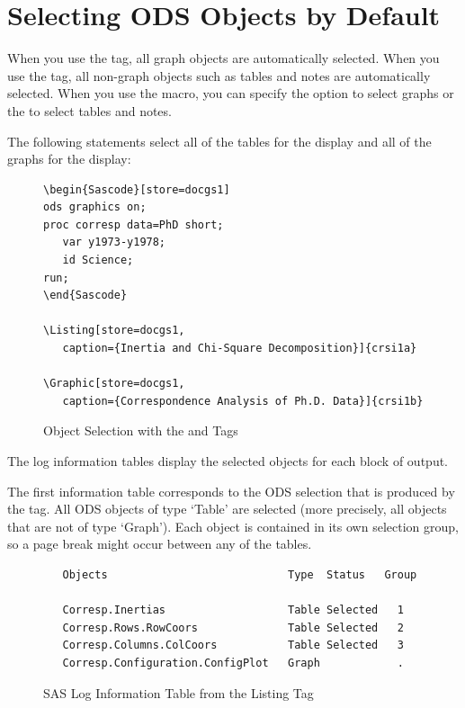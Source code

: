\documentclass[article,oneside]{memoir}
\begin{document}
\section{Selecting ODS Objects by Default}\label{odsdefault}

  When you use the  tag, all graph objects are automatically selected.
  When you use the  tag, all non-graph objects such as tables and notes
  are automatically selected.  When you use the  macro, you can specify
  the  option to select graphs or the  to
  select tables and notes.

  The following statements select all of the tables for the 
  display and all of the graphs for the  display:

\begin{figure}[H]
\begin{snugshade}
\begin{verbatim}
\begin{Sascode}[store=docgs1]
ods graphics on;
proc corresp data=PhD short;
   var y1973-y1978;
   id Science;
run;
\end{Sascode}

\Listing[store=docgs1,
   caption={Inertia and Chi-Square Decomposition}]{crsi1a}

\Graphic[store=docgs1,
   caption={Correspondence Analysis of Ph.D. Data}]{crsi1b}
\end{verbatim}
\end{snugshade}
\caption{Object Selection with the  and  Tags}\label{optionoption}
\end{figure}

  The log information tables display the selected objects for each
  block of output.

  The first information table corresponds to the ODS selection that is produced
  by the  tag. All ODS objects of type `Table' are
  selected (more precisely, all objects that are not of type `Graph').
  Each object is contained in its own selection group, so
  a page break might occur between any of the tables.

\begin{figure}[H]
\begin{snugshade}
\begin{verbatim}
   Objects                            Type  Status   Group

   Corresp.Inertias                   Table Selected   1
   Corresp.Rows.RowCoors              Table Selected   2
   Corresp.Columns.ColCoors           Table Selected   3
   Corresp.Configuration.ConfigPlot   Graph            .
\end{verbatim}
\end{snugshade}
\caption{SAS Log Information Table from the Listing Tag}\label{loglstinfo}
\end{figure}
\end{document}
